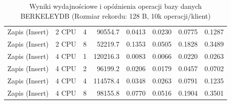 \begin{table}[ht]
{\begin{tabular}{llcrrrrr}
Zapis (Insert) & 2 CPU & 4 & 90554.7 & 0.0413 & 0.0230 & 0.0775 & 0.1287 \\
Zapis (Insert) & 2 CPU & 8 & 52219.7 & 0.1353 & 0.0505 & 0.1828 & 0.3489 \\
Zapis (Insert) & 4 CPU & 1 & 120216.3 & 0.0083 & 0.0066 & 0.0220 & 0.0263 \\
Zapis (Insert) & 4 CPU & 2 & 96199.2 & 0.0206 & 0.0179 & 0.0457 & 0.0702 \\
Zapis (Insert) & 4 CPU & 4 & 114578.4 & 0.0348 & 0.0263 & 0.0791 & 0.1235 \\
Zapis (Insert) & 4 CPU & 8 & 98155.8 & 0.0770 & 0.0516 & 0.1904 & 0.3501 \\
\bottomrule
\end{tabular}%
}
\caption{Wyniki wydajnościowe i opóźnienia operacji bazy danych BERKELEYDB (Rozmiar rekordu: 128 B, 10k operacji/klient)}
\label{tab:latency_berkeleydb_small_10000}
\end{table}
